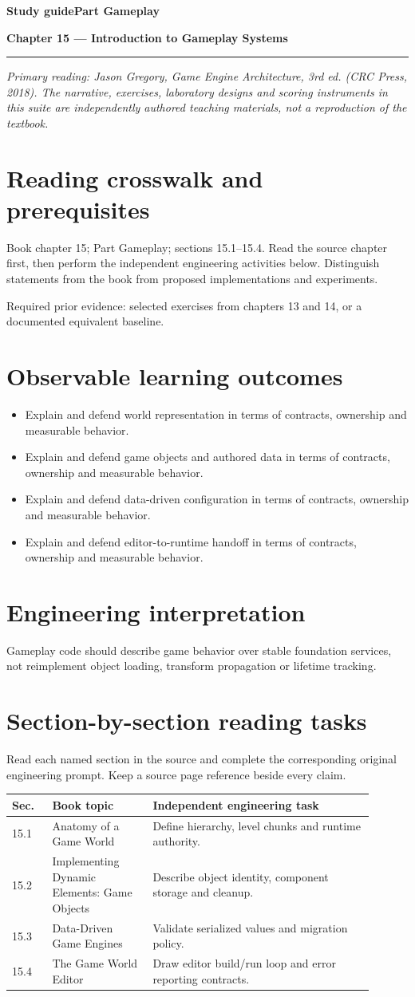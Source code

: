 \documentclass[11pt,letterpaper]{article}
\newcommand{\DocType}{Reference}
\newcommand{\SuiteHeading}[3]{%
\renewcommand{\DocType}{#2}%
{\small\bfseries\sffamily\color{EngineTeal}#2\hfill #3}\par\vspace{6pt}
{\LARGE\bfseries\color{EngineBlue}#1}\par\vspace{4pt}
{\color{EngineTeal}\rule{\linewidth}{1pt}}\par\vspace{7pt}}
\newcommand{\SourceNote}{\footnotesize\textit{Primary reading: Jason Gregory, \emph{Game Engine Architecture}, 3rd ed. (CRC Press, 2018). The narrative, exercises, laboratory designs and scoring instruments in this suite are independently authored teaching materials, not a reproduction of the textbook.}\normalsize\par}
\begin{document}
\SuiteHeading{Chapter 15 — Introduction to Gameplay Systems}{Study guide}{Part Gameplay}
\SourceNote
\section{Reading crosswalk and prerequisites}
Book chapter 15; Part Gameplay; sections 15.1--15.4. Read the source chapter first, then perform the independent engineering activities below. Distinguish statements from the book from proposed implementations and experiments.

Required prior evidence: selected exercises from chapters 13 and 14, or a documented equivalent baseline.

\section{Observable learning outcomes}
\begin{itemize}
\item Explain and defend world representation in terms of contracts, ownership and measurable behavior.
\item Explain and defend game objects and authored data in terms of contracts, ownership and measurable behavior.
\item Explain and defend data-driven configuration in terms of contracts, ownership and measurable behavior.
\item Explain and defend editor-to-runtime handoff in terms of contracts, ownership and measurable behavior.
\end{itemize}
\section{Engineering interpretation}
Gameplay code should describe game behavior over stable foundation services, not reimplement object loading, transform propagation or lifetime tracking.

\section{Section-by-section reading tasks}
Read each named section in the source and complete the corresponding original engineering prompt. Keep a source page reference beside every claim.
\small\begin{longtable}{|p{0.10\linewidth}|p{0.25\linewidth}|p{0.55\linewidth}|}
\hline \textbf{Sec.} & \textbf{Book topic} & \textbf{Independent engineering task} \\ \hline\endhead
15.1 & Anatomy of a Game World & Define hierarchy, level chunks and runtime authority. \\ \hline
15.2 & Implementing Dynamic Elements: Game Objects & Describe object identity, component storage and cleanup. \\ \hline
15.3 & Data-Driven Game Engines & Validate serialized values and migration policy. \\ \hline
15.4 & The Game World Editor & Draw editor build/run loop and error reporting contracts. \\ \hline
\end{longtable}\normalsize
\end{document}
